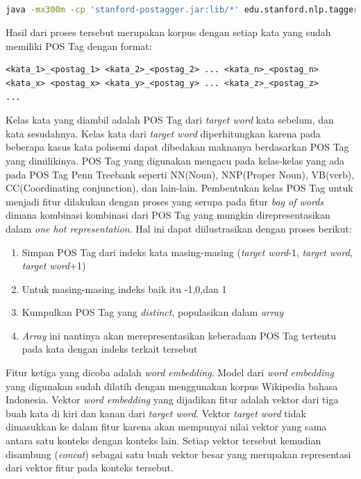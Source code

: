 \begin{lstlisting}[language=bash,caption={Stanford POS Tagger}, label={stanford-pos-tagger}]

java -mx300m -cp 'stanford-postagger.jar:lib/*' edu.stanford.nlp.tagger.maxent.MaxentTagger -model <model_bahasa_indonesia> -textFile <korpus_bahasa_indonesia>

\end{lstlisting}

Hasil dari proses tersebut merupakan korpus dengan setiap kata yang sudah memiliki POS Tag dengan format:

\begin{lstlisting}
<kata_1>_<postag_1> <kata_2>_<postag_2> ... <kata_n>_<postag_n>
<kata_x> <postag_x> <kata_y>_<postag_y> ... <kata_z>_<postag_z>
...
\end{lstlisting}

Kelas kata yang diambil adalah POS Tag dari \textit{target word} kata sebelum, dan kata sesudahnya. Kelas kata dari \textit{target word} diperhitungkan karena pada beberapa kasus kata polisemi dapat dibedakan maknanya berdasarkan POS Tag yang dimilikinya. POS Tag yang digunakan mengacu pada kelas-kelas yang ada pada POS Tag Penn Treebank seperti NN(Noun), NNP(Proper Noun), VB(verb), CC(Coordinating conjunction), dan lain-lain. Pembentukan kelas POS Tag untuk menjadi fitur dilakukan dengan proses yang serupa pada fitur \textit{bag of words} dimana kombinasi kombinasi dari POS Tag yang mungkin direpresentasikan dalam \textit{one hot representation}. Hal ini dapat diilustrasikan dengan proses berikut:

\begin{enumerate}
	\item Simpan POS Tag dari indeks kata masing-masing (\textit{target word}-1, \textit{target word}, \textit{target word}+1)
	\item Untuk masing-masing indeks baik itu -1,0,dan 1
	\item Kumpulkan POS Tag yang \textit{distinct}, populasikan dalam \textit{array}
	\item \textit{Array} ini nantinya akan merepresentasikan keberadaan POS Tag tertentu pada kata dengan indeks terkait tersebut
\end{enumerate}

Fitur ketiga yang dicoba adalah \textit{word embedding}. Model dari \textit{word embedding} yang digunakan sudah dilatih dengan menggunakan korpus Wikipedia bahasa Indonesia. Vektor \textit{word embedding} yang dijadikan fitur adalah vektor dari tiga buah kata di kiri dan kanan dari \textit{target word}. Vektor \textit{target word} tidak dimasukkan ke dalam fitur karena akan mempunyai nilai vektor yang sama antara satu konteks dengan konteks lain. Setiap vektor tersebut kemudian disambung (\textit{concat}) sebagai satu buah vektor besar yang merupakan representasi dari vektor fitur pada konteks tersebut. 

